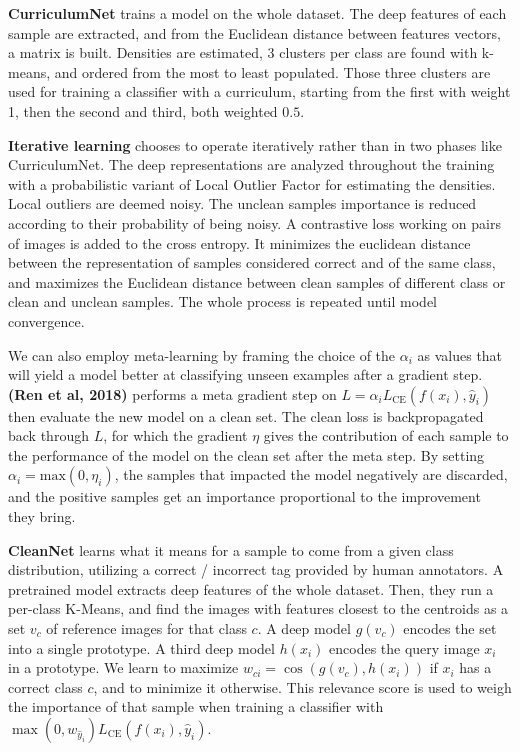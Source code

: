 \textbf{CurriculumNet} \citep{CurriculumNet}
trains a model on the whole dataset. The deep features of each sample are extracted, and from the Euclidean distance between features vectors, a matrix is built. Densities are estimated, 3 clusters per class are found with k-means, and ordered from the most to least populated. Those three clusters are used for training a classifier with a curriculum, starting from the first with weight 1, then the second and third, both weighted $0.5$.

\textbf{Iterative learning} \citep{IterativeLearning} chooses to operate iteratively rather than in two phases like CurriculumNet. The deep representations are analyzed throughout the training with a probabilistic variant of Local Outlier Factor \citep{LOF} for estimating the densities. Local outliers are deemed noisy. The unclean samples importance is reduced according to their probability of being noisy. A contrastive loss working on pairs of images is added to the cross entropy. It minimizes the euclidean distance between the representation of samples considered correct and of the same class, and maximizes the Euclidean distance between clean samples of different class or clean and unclean samples. The whole process is repeated until model convergence.

We can also employ meta-learning by framing the choice of the $\alpha_i$ as values that will yield a model better at classifying unseen examples after a gradient step. \textbf{(Ren et al, 2018)} \citep{Reweight} performs a meta gradient step on $L=\alpha_iL_\text{CE}(f(x_i), \hat{y}_i)$ then evaluate the new model on a clean set. The clean loss is backpropagated back through $L$, for which the gradient $\eta$ gives the contribution of each sample to the performance of the model on the clean set after the meta step. By setting $\alpha_i = \text{max}(0, \eta_i)$, the samples that impacted the model negatively are discarded, and the positive samples get an importance proportional to the improvement they bring.

\textbf{CleanNet} \citep{CleanNet} learns what it means for a sample to come from a given class distribution, utilizing a correct / incorrect tag provided by human annotators. A pretrained model extracts deep features of the whole dataset. Then, they run a per-class K-Means, and find the images with features closest to the centroids as a set $v_c$ of reference images for that class $c$. A deep model $g(v_c)$ encodes the set into a single prototype. A third deep model $h(x_i)$ encodes the query image $x_i$ in a prototype. We learn to maximize $w_{ci}=\cos(g(v_{c}), h(x_{i}))$ if $x_i$ has a correct class $c$, and to minimize it otherwise. This relevance score is used to weigh the importance of that sample when training a classifier with $\max(0, w_{\hat{y}_i}) L_{\text{CE}}(f(x_i), \hat{y}_i)$.

